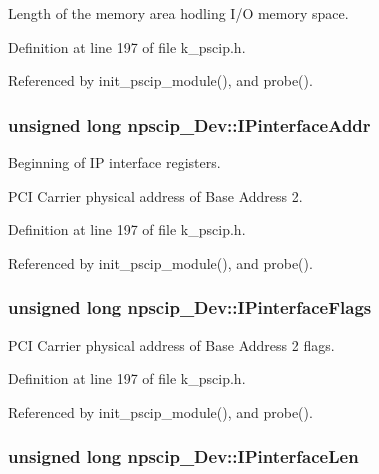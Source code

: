 Length of the memory area hodling I/O memory space. 



Definition at line 197 of file k\_\-pscip.h.

Referenced by init\_\-pscip\_\-module(), and probe().\hypertarget{structnpscip___dev_f2580a0984d58cf0423092bc9fe9d137}{
\subsubsection[{IPinterfaceAddr}]{\setlength{\rightskip}{0pt plus 5cm}unsigned long {\bf npscip\_\-Dev::IPinterfaceAddr}}}
\label{structnpscip___dev_f2580a0984d58cf0423092bc9fe9d137}


Beginning of IP interface registers. 

PCI Carrier physical address of Base Address 2. 

Definition at line 197 of file k\_\-pscip.h.

Referenced by init\_\-pscip\_\-module(), and probe().\hypertarget{structnpscip___dev_0ff404840e5bbfed8506602e516f83cb}{
\subsubsection[{IPinterfaceFlags}]{\setlength{\rightskip}{0pt plus 5cm}unsigned long {\bf npscip\_\-Dev::IPinterfaceFlags}}}
\label{structnpscip___dev_0ff404840e5bbfed8506602e516f83cb}


PCI Carrier physical address of Base Address 2 flags. 



Definition at line 197 of file k\_\-pscip.h.

Referenced by init\_\-pscip\_\-module(), and probe().\hypertarget{structnpscip___dev_746b6f405b829de9bc181a7cc628f5d9}{
\subsubsection[{IPinterfaceLen}]{\setlength{\rightskip}{0pt plus 5cm}unsigned long {\bf npscip\_\-Dev::IPinterfaceLen}}}
\label{structnpscip___dev_746b6f405b829de9bc181a7cc628f5d9}


